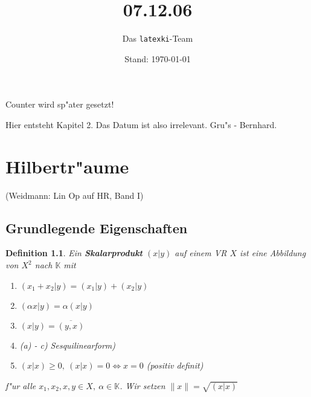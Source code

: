 \documentclass[a4paper,11pt]{book}
\title{07.12.06}
\author{Das \texttt{latexki}-Team\\[8 cm]}
\date{Stand: \today}
\newcommand{\K}{{\mathbb K}}
\newcommand{\begriff}[1]{\textbf{#1}} %
\newtheorem{Def}{Definition}[chapter]
\theoremstyle{nonumberplain}
\begin{document}
Counter wird sp"ater gesetzt!

Hier entsteht Kapitel 2. Das Datum ist also irrelevant. Gru"s - Bernhard.\\




\chapter{Hilbertr"aume}

(Weidmann: Lin Op auf HR, Band I)

\section{Grundlegende Eigenschaften}

\begin{Def}
Ein \begriff{Skalarprodukt} $(x|y)$ auf einem VR $X$ ist eine Abbildung von $X^2$ nach $\K$ mit
\begin{enumerate}
\item $(x_1 + x_2 | y) = (x_1|y) + (x_2|y)$
\item $(\alpha x|y) = \alpha(x|y)$
\item $(x|y) = \overline{(y,x)}$
\item[] (a) - c) Sesquilinearform)
\item[d)] $(x|x) \geq 0,\ (x|x) = 0 \Leftrightarrow x = 0$ (positiv definit)
\end{enumerate}
f"ur alle $x_1,x_2,x,y \in X,\ \alpha \in \K$. Wir setzen $\|x\|=\sqrt{(x|x)}$
\end{Def}
\end{document}
